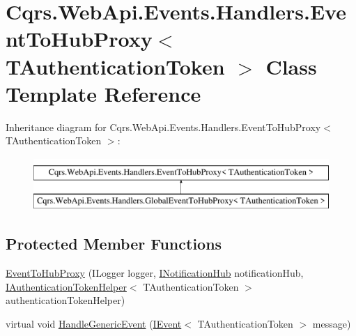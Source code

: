 \hypertarget{classCqrs_1_1WebApi_1_1Events_1_1Handlers_1_1EventToHubProxy}{}\section{Cqrs.\+Web\+Api.\+Events.\+Handlers.\+Event\+To\+Hub\+Proxy$<$ T\+Authentication\+Token $>$ Class Template Reference}
\label{classCqrs_1_1WebApi_1_1Events_1_1Handlers_1_1EventToHubProxy}
Inheritance diagram for Cqrs.\+Web\+Api.\+Events.\+Handlers.\+Event\+To\+Hub\+Proxy$<$ T\+Authentication\+Token $>$\+:\begin{figure}[H]
\begin{center}
\leavevmode
\includegraphics[height=2.000000cm]{classCqrs_1_1WebApi_1_1Events_1_1Handlers_1_1EventToHubProxy}
\end{center}
\end{figure}
\subsection*{Protected Member Functions}
\begin{DoxyCompactItemize}
\item 
\hyperlink{classCqrs_1_1WebApi_1_1Events_1_1Handlers_1_1EventToHubProxy_a11ce35ab8f01b97b95b757e246c9cdcd_a11ce35ab8f01b97b95b757e246c9cdcd}{Event\+To\+Hub\+Proxy} (I\+Logger logger, \hyperlink{interfaceCqrs_1_1WebApi_1_1SignalR_1_1Hubs_1_1INotificationHub}{I\+Notification\+Hub} notification\+Hub, \hyperlink{interfaceCqrs_1_1Authentication_1_1IAuthenticationTokenHelper}{I\+Authentication\+Token\+Helper}$<$ T\+Authentication\+Token $>$ authentication\+Token\+Helper)
\item 
virtual void \hyperlink{classCqrs_1_1WebApi_1_1Events_1_1Handlers_1_1EventToHubProxy_a310fc8d40bfbe514406716150f30b74d_a310fc8d40bfbe514406716150f30b74d}{Handle\+Generic\+Event} (\hyperlink{interfaceCqrs_1_1Events_1_1IEvent}{I\+Event}$<$ T\+Authentication\+Token $>$ message)
\end{DoxyCompactItemize}
